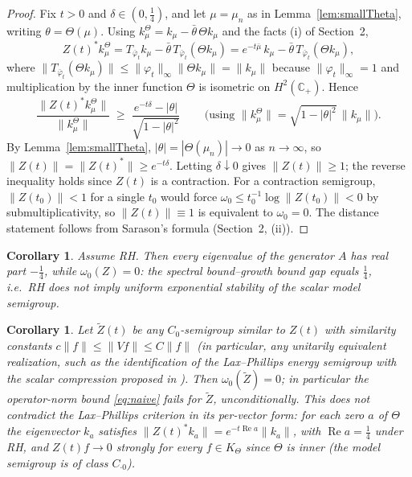 \documentclass[11pt]{amsart}
\newtheorem{corollary}[theorem]{Corollary}
\theoremstyle{remark}
\newcommand{\Cp}{\mathbb{C}_{+}}
\newcommand{\HH}{H^{2}(\Cp)}
\newcommand{\KT}{K_{\Theta}}
\newcommand{\re}{\operatorname{Re}}
\begin{document}
\begin{proof}
Fix $t>0$ and $\delta\in(0,\tfrac14)$, and let $\mu=\mu_{n}$ as in
Lemma~\ref{lem:smallTheta}, writing $\theta=\Theta(\mu)$. Using
$k^{\Theta}_{\mu}=k_{\mu}-\bar\theta\,\Theta k_{\mu}$ and the facts
(i) of Section~2,
\[
  Z(t)^{*}k^{\Theta}_{\mu}
  = T_{\bar\varphi_{t}}k_{\mu}
    -\bar\theta\,T_{\bar\varphi_{t}}(\Theta k_{\mu})
  = e^{-t\bar\mu}\,k_{\mu}
    -\bar\theta\,T_{\bar\varphi_{t}}(\Theta k_{\mu}),
\]
where $\|T_{\bar\varphi_{t}}(\Theta k_{\mu})\|\le
\|\varphi_{t}\|_{\infty}\|\Theta k_{\mu}\|=\|k_{\mu}\|$ because
$\|\varphi_{t}\|_{\infty}=1$ and multiplication by the inner function
$\Theta$ is isometric on $\HH$. Hence
\[
  \frac{\|Z(t)^{*}k^{\Theta}_{\mu}\|}{\|k^{\Theta}_{\mu}\|}
  \;\ge\;
  \frac{e^{-t\delta}-|\theta|}{\sqrt{1-|\theta|^{2}}}\,
  \qquad\text{(using } \|k^{\Theta}_{\mu}\|
    =\sqrt{1-|\theta|^{2}}\,\|k_{\mu}\| \text{)} .
\]
By Lemma~\ref{lem:smallTheta}, $|\theta|=|\Theta(\mu_{n})|\to0$ as
$n\to\infty$, so $\|Z(t)\|=\|Z(t)^{*}\|\ge e^{-t\delta}$. Letting
$\delta\downarrow0$ gives $\|Z(t)\|\ge1$; the reverse inequality holds
since $Z(t)$ is a contraction. For a contraction semigroup,
$\|Z(t_{0})\|<1$ for a single $t_{0}$ would force
$\omega_{0}\le t_{0}^{-1}\log\|Z(t_{0})\|<0$ by submultiplicativity, so
$\|Z(t)\|\equiv1$ is equivalent to $\omega_{0}=0$. The distance
statement follows from Sarason's formula (Section~2, (ii)).
\end{proof}

\begin{corollary}\label{cor:gap}
Assume RH. Then every eigenvalue of the generator $A$ has real part
$-\tfrac14$, while $\omega_{0}(Z)=0$: the spectral bound--growth bound
gap equals $\tfrac14$, i.e.\ RH does \emph{not} imply uniform
exponential stability of the scalar model semigroup.
\end{corollary}

\begin{corollary}\label{cor:LP}
Let $\widetilde Z(t)$ be any $C_{0}$-semigroup similar to $Z(t)$ with
similarity constants $c\|f\|\le\|Vf\|\le C\|f\|$ (in particular, any
unitarily equivalent realization, such as the identification of the
Lax--Phillips energy semigroup with the scalar compression proposed in
\cite{Uetake}). Then $\omega_{0}(\widetilde Z)=0$; in particular the
operator-norm bound \eqref{eq:naive} fails for $\widetilde Z$,
unconditionally. This does not contradict the Lax--Phillips criterion
in its per-vector form: for each zero $a$ of $\Theta$ the eigenvector
$k_{a}$ satisfies $\|Z(t)^{*}k_{a}\|=e^{-t\re a}\|k_{a}\|$, with
$\re a=\tfrac14$ under RH, and $Z(t)f\to0$ strongly for every
$f\in\KT$ since $\Theta$ is inner (the model semigroup is of class
$C_{\cdot0}$).
\end{corollary}
\end{document}
